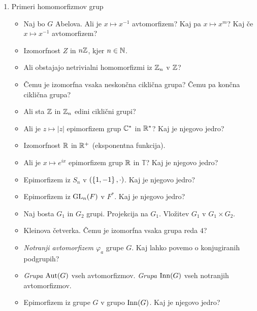 \begin{enumerate}
    \item Primeri homomorfizmov grup
    \begin{itemize}
        \item Naj bo $G$ Abelova. Ali je $x \mapsto x^{-1}$ avtomorfizem? Kaj pa $x \mapsto x^{m}$? Kaj če $x \mapsto x^{-1}$ avtomorfizem?
        \item Izomorfnost $Z$ in $n\mathbb{Z}$, kjer $n \in \mathbb{N}$.
        \item Ali obstajajo netrivialni homomorfizmi iz $\mathbb{Z}_n$ v $\mathbb{Z}$?
        \item Čemu je izomorfna vsaka neskončna ciklična grupa? Čemu pa končna ciklična grupa?
        \item Ali sta $\mathbb{Z}$ in $\mathbb{Z}_n$ edini ciklični grupi?
        \item Ali je $z \mapsto |z|$ epimorfizem grup $\mathbb{C}^*$ in $\mathbb{R}^*$? Kaj je njegovo jedro?
        \item Izomorfnost $\mathbb{R}$ in $\mathbb{R}^+$ (eksponentna funkcija).
        \item Ali je $x \mapsto e^{ix}$ epimorfizem grup $\mathbb{R}$ in $\mathbb{T}$? Kaj je njegovo jedro?
        \item Epimorfizem iz $S_n$ v $(\left\{1, -1\right\}, \cdot)$. Kaj je njegovo jedro?
        \item Epimorfizem iz $\operatorname{GL}_n(F)$ v $F^*$. Kaj je njegovo jedro?
        \item Naj bosta $G_1$ in $G_2$ grupi. Projekcija na $G_1$. Vložitev $G_1$ v $G_1 \times G_2$.
        \item Kleinova četverka. Čemu je izomorfna vsaka grupa reda $4$?
        \item \emph{Notranji avtomorfizem $\varphi_a$} grupe $G$. Kaj lahko povemo o konjugiranih podgrupih?
        \item \emph{Grupa $\operatorname{Aut}(G)$} vseh avtomorfizmov. \emph{Grupa $\operatorname{Inn}(G)$} vseh notranjih avtomorfizmov.
        \item Epimorfizem iz grupe $G$ v grupo $\operatorname{Inn}(G)$. Kaj je njegovo jedro?
    \end{itemize}


\end{enumerate}
